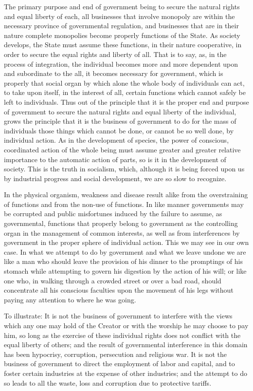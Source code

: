 \documentclass{book}
\begin{document}
The primary purpose and end of government being to secure the natural rights and equal liberty of each, all businesses that involve monopoly are within the necessary province of governmental regulation, and businesses that are in their nature complete monopolies become properly functions of the State. As society develops, the State must assume these functions, in their nature cooperative, in order to secure the equal rights and liberty of all. That is to say, as, in the process of integration, the individual becomes more and more dependent upon and subordinate to the all, it becomes necessary for government, which is properly that social organ by which alone the whole body of individuals can act, to take upon itself, in the interest of all, certain functions which cannot safely be left to individuals. Thus out of the principle that it is the proper end and purpose of government to secure the natural rights and equal liberty of the individual, grows the principle that it is the business of government to do for the mass of individuals those things which cannot be done, or cannot be so well done, by individual action. As in the development of species, the power of conscious, coordinated action of the whole being must assume greater and greater relative importance to the automatic action of parts, so is it in the development of society. This is the truth in socialism, which, although it is being forced upon us by industrial progress and social development, we are so slow to recognize.

In the physical organism, weakness and disease result alike from the overstraining of functions and from the non-use of functions. In like manner governments may be corrupted and public misfortunes induced by the failure to assume, as governmental, functions that properly belong to government as the controlling organ in the management of common interests, as well as from interferences by government in the proper sphere of individual action. This we may see in our own case. In what we attempt to do by government and what we leave undone we are like a man who should leave the provision of his dinner to the promptings of his stomach while attempting to govern his digestion by the action of his will; or like one who, in walking through a crowded street or over a bad road, should concentrate all his conscious faculties upon the movement of his legs without paying any attention to where he was going.

To illustrate: It is not the business of government to interfere with the views which any one may hold of the Creator or with the worship he may choose to pay him, so long as the exercise of these individual rights does not conflict with the equal liberty of others; and the result of governmental interference in this domain has been hypocrisy, corruption, persecution and religious war. It is not the business of government to direct the employment of labor and capital, and to foster certain industries at the expense of other industries; and the attempt to do so leads to all the waste, loss and corruption due to protective tariffs.
\end{document}

